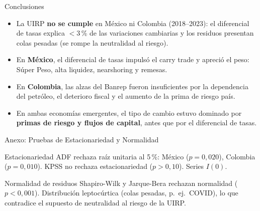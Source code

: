 \documentclass[10pt,professionalfonts,aspectratio=169]{beamer}
\begin{document}
\begin{frame}{Conclusiones}
    \begin{itemize}
        \item La UIRP \textbf{no se cumple} en México ni Colombia (2018--2023): el diferencial de tasas explica $< 3$\,\% de las variaciones cambiarias y los residuos presentan colas pesadas (se rompe la neutralidad al riesgo).
        \item En \textbf{México}, el diferencial de tasas impulsó el carry trade y apreció el peso: Súper Peso, alta liquidez, nearshoring \parencite{imf2023} y remesas.
        \item En \textbf{Colombia}, las alzas del Banrep fueron insuficientes por la dependencia del petróleo, el deterioro fiscal y el aumento de la prima de riesgo país.
        \item En ambas economías emergentes, el tipo de cambio estuvo dominado por \textbf{primas de riesgo y flujos de capital}, antes que por el diferencial de tasas.
    \end{itemize}
\end{frame}

\begin{frame}{Anexo: Pruebas de Estacionariedad y Normalidad}
    \begin{block}{Estacionariedad}
        ADF rechaza raíz unitaria al 5\,\%: México ($p = 0{,}020$), Colombia ($p = 0{,}010$). KPSS no rechaza estacionariedad ($p > 0{,}10$). Series $I(0)$.
    \end{block}

    \begin{block}{Normalidad de residuos}
        Shapiro-Wilk y Jarque-Bera rechazan normalidad ($p < 0{,}001$). Distribución leptocúrtica (colas pesadas, p.~ej.\ COVID), lo que contradice el supuesto de neutralidad al riesgo de la UIRP.
    \end{block}
\end{frame}
\end{document}
